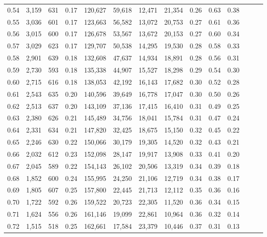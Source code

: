 \begin{tabular}{rrrrrrrrrrrrrr}
0.54 &  3,159 &    631 &  0.17 &  120,627 &   59,618 &  12,471 &  21,354 &  0.26 &  0.63 &      0.38 \\
0.55 &  3,036 &    601 &  0.17 &  123,663 &   56,582 &  13,072 &  20,753 &  0.27 &  0.61 &      0.36 \\
0.56 &  3,015 &    600 &  0.17 &  126,678 &   53,567 &  13,672 &  20,153 &  0.27 &  0.60 &      0.34 \\
0.57 &  3,029 &    623 &  0.17 &  129,707 &   50,538 &  14,295 &  19,530 &  0.28 &  0.58 &      0.33 \\
0.58 &  2,901 &    639 &  0.18 &  132,608 &   47,637 &  14,934 &  18,891 &  0.28 &  0.56 &      0.31 \\
0.59 &  2,730 &    593 &  0.18 &  135,338 &   44,907 &  15,527 &  18,298 &  0.29 &  0.54 &      0.30 \\
0.60 &  2,715 &    616 &  0.18 &  138,053 &   42,192 &  16,143 &  17,682 &  0.30 &  0.52 &      0.28 \\
0.61 &  2,543 &    635 &  0.20 &  140,596 &   39,649 &  16,778 &  17,047 &  0.30 &  0.50 &      0.26 \\
0.62 &  2,513 &    637 &  0.20 &  143,109 &   37,136 &  17,415 &  16,410 &  0.31 &  0.49 &      0.25 \\
0.63 &  2,380 &    626 &  0.21 &  145,489 &   34,756 &  18,041 &  15,784 &  0.31 &  0.47 &      0.24 \\
0.64 &  2,331 &    634 &  0.21 &  147,820 &   32,425 &  18,675 &  15,150 &  0.32 &  0.45 &      0.22 \\
0.65 &  2,246 &    630 &  0.22 &  150,066 &   30,179 &  19,305 &  14,520 &  0.32 &  0.43 &      0.21 \\
0.66 &  2,032 &    612 &  0.23 &  152,098 &   28,147 &  19,917 &  13,908 &  0.33 &  0.41 &      0.20 \\
0.67 &  2,045 &    589 &  0.22 &  154,143 &   26,102 &  20,506 &  13,319 &  0.34 &  0.39 &      0.18 \\
0.68 &  1,852 &    600 &  0.24 &  155,995 &   24,250 &  21,106 &  12,719 &  0.34 &  0.38 &      0.17 \\
0.69 &  1,805 &    607 &  0.25 &  157,800 &   22,445 &  21,713 &  12,112 &  0.35 &  0.36 &      0.16 \\
0.70 &  1,722 &    592 &  0.26 &  159,522 &   20,723 &  22,305 &  11,520 &  0.36 &  0.34 &      0.15 \\
0.71 &  1,624 &    556 &  0.26 &  161,146 &   19,099 &  22,861 &  10,964 &  0.36 &  0.32 &      0.14 \\
0.72 &  1,515 &    518 &  0.25 &  162,661 &   17,584 &  23,379 &  10,446 &  0.37 &  0.31 &      0.13 \\

\end{tabular}
